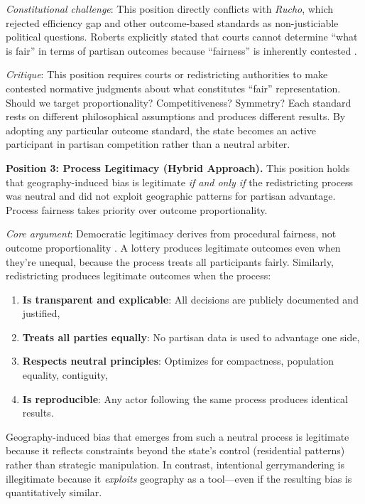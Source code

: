 \textit{Constitutional challenge}: This position directly conflicts with \textit{Rucho}, which rejected efficiency gap and other outcome-based standards as non-justiciable political questions. Roberts explicitly stated that courts cannot determine ``what is fair'' in terms of partisan outcomes because ``fairness'' is inherently contested \citep{rucho2019}.

\textit{Critique}: This position requires courts or redistricting authorities to make contested normative judgments about what constitutes ``fair'' representation. Should we target proportionality? Competitiveness? Symmetry? Each standard rests on different philosophical assumptions and produces different results. By adopting any particular outcome standard, the state becomes an active participant in partisan competition rather than a neutral arbiter.

\textbf{Position 3: Process Legitimacy (Hybrid Approach).}
This position holds that geography-induced bias is legitimate \textit{if and only if} the redistricting process was neutral and did not exploit geographic patterns for partisan advantage. Process fairness takes priority over outcome proportionality.

\textit{Core argument}: Democratic legitimacy derives from procedural fairness, not outcome proportionality \citep{rawls1971}. A lottery produces legitimate outcomes even when they're unequal, because the process treats all participants fairly. Similarly, redistricting produces legitimate outcomes when the process:
\begin{enumerate}[label=(\alph*)]
\item \textbf{Is transparent and explicable}: All decisions are publicly documented and justified,
\item \textbf{Treats all parties equally}: No partisan data is used to advantage one side,
\item \textbf{Respects neutral principles}: Optimizes for compactness, population equality, contiguity,
\item \textbf{Is reproducible}: Any actor following the same process produces identical results.
\end{enumerate}

Geography-induced bias that emerges from such a neutral process is legitimate because it reflects constraints beyond the state's control (residential patterns) rather than strategic manipulation. In contrast, intentional gerrymandering is illegitimate because it \textit{exploits} geography as a tool---even if the resulting bias is quantitatively similar.

